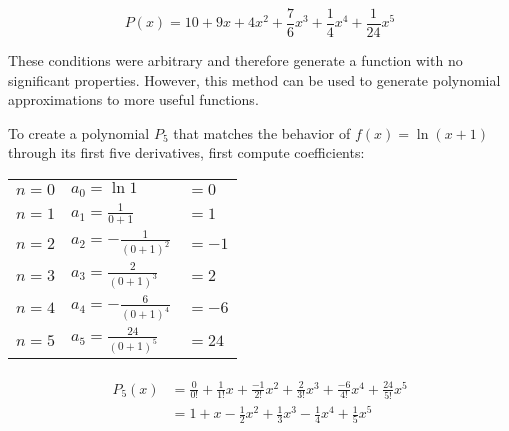 \documentclass[10pt]{article}
\theoremstyle{definition}
\begin{document}
\[P(x)=10+9x+4x^2+\frac{7}{6}x^3+\frac{1}{4}x^4+\frac{1}{24}x^5\]

These conditions were arbitrary and therefore generate a function with no significant properties. However, this method can be used to generate polynomial approximations to more useful functions.

\newpage

To create a polynomial $P_5$ that matches the behavior of $f(x)=\ln (x+1)$ through its first five derivatives, first compute coefficients:

\renewcommand{\arraystretch}{1.2}

\begin{center}
\begin{tabular}{l l l}
$n=0$    &$a_0=\ln 1$ & $= 0$ \\
$n=1$    &$a_1=\frac{1}{0+1}$ & $=1$ \\
$n=2$    &$a_2=-\frac{1}{(0+1)^2}$ & $= -1$ \\
$n=3$    &$a_3=\frac{2}{(0+1)^3}$ & $= 2$ \\
$n=4$    &$a_4=-\frac{6}{(0+1)^4}$ & $= -6$ \\
$n=5$    &$a_5=\frac{24}{(0+1)^5}$ & $= 24$ \\
\end{tabular}
\end{center}

\begin{align*}
\begin{split}
    P_5(x)&=\frac{0}{0!}+\frac{1}{1!}x+\frac{-1}{2!}x^2+\frac{2}{3!}x^3+\frac{-6}{4!}x^4+\frac{24}{5!}x^5 \\
    &= 1+x-\frac{1}{2}x^2+\frac{1}{3}x^3-\frac{1}{4}x^4+\frac{1}{5}x^5
\end{split}
\end{align*}
\end{document}
